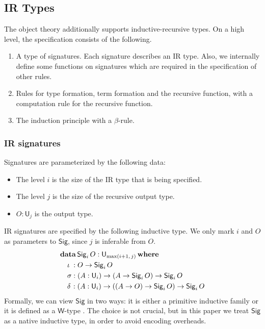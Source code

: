 \documentclass[acmsmall,screen,review,anonymous]{acmart}
\newcommand{\msf}[1]{{\mathsf{#1}}}
\newcommand{\mbf}[1]{{\mathbf{#1}}}
\newcommand{\data}{\mbf{data}}
\newcommand{\U}{\msf{U}}
\newcommand{\where}{\mbf{where}}
\newcommand{\Sig}{\msf{Sig}}
\begin{document}
\subsection{IR Types}\label{sec:ir-specification}
The object theory additionally supports inductive-recursive types. On a high level, the
specification consists of the following.
\begin{enumerate}
\item A type of signatures. Each signature describes an IR type. Also, we internally define some
  functions on signatures which are required in the specification of other rules.
\item Rules for type formation, term formation and the recursive function, with a computation rule
  for the recursive function.
\item The induction principle with a $\beta$-rule.
\end{enumerate}

\subsubsection{IR signatures}\label{sec:ir-signatures}
Signatures are parameterized by the following data:
\begin{itemize}
\item The level $i$ is the size of the IR type that is being specified.
\item The level $j$ is the size of the recursive output type.
\item $O : \U_j$ is the output type.
\end{itemize}
IR signatures are specified by the following inductive type. We only mark $i$ and $O$ as parameters to $\Sig$,
since $j$ is inferable from $O$.
\begin{alignat*}{4}
  &\data\, \Sig_i\,O : \U_{\max(i+1,\,j)}\,\where\\
  &\quad \iota\hspace{0.25em}  : O \to \Sig_i\,O \\
  &\quad \sigma               : (A : \U_i) \to (A \to \Sig_i\,O) \to \Sig_i\,O \\
  &\quad \delta\hspace{0.1em} : (A : \U_i) \to ((A \to O) \to \Sig_i\,O) \to \Sig_i\,O
\end{alignat*}
Formally, we can view $\Sig$ in two ways: it is either a primitive inductive family \cite{inductivefamilies} or
it is defined as a $\msf{W}$-type \cite{whynotw}. The choice is not crucial, but in this paper
we treat $\Sig$ as a native inductive type, in order to avoid encoding overheads.
\end{document}
